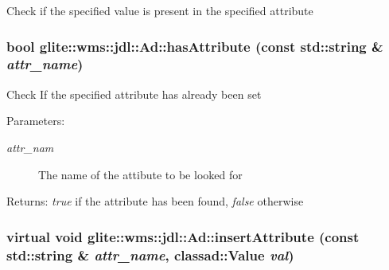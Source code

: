 Check if the specified value is present in the specified attribute \hypertarget{classglite_1_1wms_1_1jdl_1_1Ad_z17_0}{
\subsubsection[hasAttribute]{\setlength{\rightskip}{0pt plus 5cm}bool glite::wms::jdl::Ad::has\-Attribute (const std::string \& {\em attr\_\-name})}}
\label{classglite_1_1wms_1_1jdl_1_1Ad_z17_0}


Check If the specified attribute has already been set \begin{Desc}
\item[Parameters:]
\begin{description}
\item[{\em attr\_\-nam}]The name of the attibute to be looked for \end{description}
\end{Desc}
\begin{Desc}
\item[Returns:]{\em true\/} if the attribute has been found, {\em false\/} otherwise \end{Desc}
\hypertarget{classglite_1_1wms_1_1jdl_1_1Ad_b3}{
\subsubsection[insertAttribute]{\setlength{\rightskip}{0pt plus 5cm}virtual void glite::wms::jdl::Ad::insert\-Attribute (const std::string \& {\em attr\_\-name}, classad::Value {\em val})}}
\label{classglite_1_1wms_1_1jdl_1_1Ad_b3}


